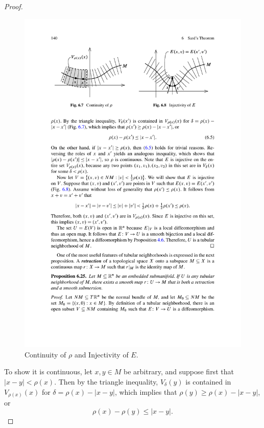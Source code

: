 \begin{proof}
\begin{figure}[htbp]
\includegraphics{pictures/tubular}
\caption{Continuity of $\rho$ and Injectivity of $E$.}
\end{figure}\par
To show it is continuous, let $x,y\in M$ be arbitrary, and suppose first that $|x-y|<\rho(x)$. Then by the triangle inequality, $V_\delta(y)$ is 
contained in $V_{\rho(x)}(x)$ for $\delta=\rho(x)-|x-y|$, which implies that $\rho(y)\geq\rho(x)-|x-y|$, or
\[\rho(x)-\rho(y)\leq|x-y|.\]


\end{proof}

